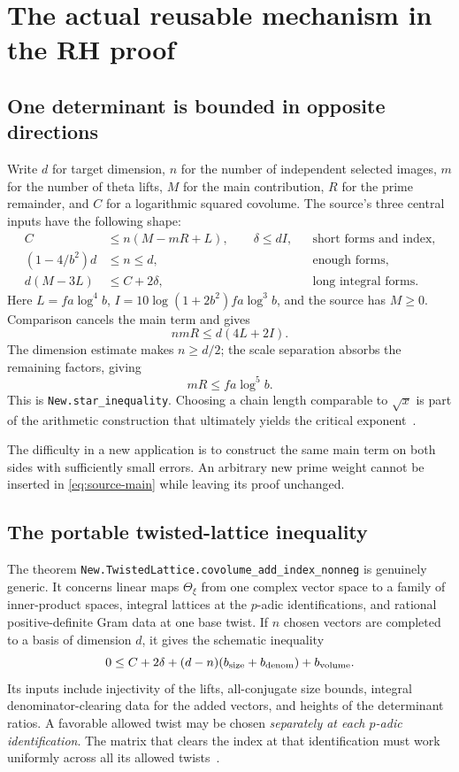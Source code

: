 \documentclass[11pt,letterpaper]{article}
\theoremstyle{remark}
\newcommand{\src}[1]{\texttt{#1}}
\begin{document}
\section{The actual reusable mechanism in the RH proof}
\label{sec:mechanism}

\subsection{One determinant is bounded in opposite directions}

Write $d$ for target dimension, $n$ for the number of independent selected
images, $m$ for the number of theta lifts, $M$ for the main contribution,
$R$ for the prime remainder, and $C$ for a logarithmic squared covolume.
The source's three central inputs have the following shape:
\begin{align*}
 C&\leq n(M-mR+L),\qquad\delta\leq dI, &&\text{short forms and index},\\
 (1-4/b^2)d&\leq n\leq d, &&\text{enough forms},\\
 d(M-3L)&\leq C+2\delta, &&\text{long integral forms}.
\end{align*}
Here $L=fa\log^4b$, $I=10\log(1+2b^2)fa\log^3b$, and the source has
$M\geq0$. Comparison cancels the main term and gives
\[
 nmR\leq d(4L+2I).
\]
The dimension estimate makes $n\geq d/2$; the scale separation absorbs
the remaining factors, giving
\begin{equation}
 mR\leq fa\log^5 b.
 \label{eq:source-main}
\end{equation}
This is \src{New.star\_inequality}. Choosing a chain length comparable to
$\sqrt{x}$ is part of the arithmetic construction that ultimately yields
the critical exponent~\cite{mainineq,guide}.

The difficulty in a new application is to construct the same main term on
both sides with sufficiently small errors. An arbitrary new prime weight
cannot be inserted in \eqref{eq:source-main} while leaving its proof
unchanged.

\subsection{The portable twisted-lattice inequality}

The theorem \src{New.TwistedLattice.covolume\_add\_index\_nonneg} is genuinely
generic. It concerns linear maps $\Theta_\xi$ from one complex vector
space to a family of inner-product spaces, integral lattices at the
$p$-adic identifications, and rational positive-definite Gram data at one
base twist. If $n$ chosen vectors are completed to a basis of dimension
$d$, it gives the schematic inequality
\begin{equation}
 0\leq C+2\delta+(d-n)(b_{\rm size}+b_{\rm denom})+b_{\rm volume}.
 \label{eq:portable-lattice}
\end{equation}
Its inputs include injectivity of the lifts, all-conjugate size bounds,
integral denominator-clearing data for the added vectors, and heights of
the determinant ratios. A favorable allowed twist may be chosen
\emph{separately at each $p$-adic identification}. The matrix that clears
the index at that identification must work uniformly across all its
allowed twists~\cite{twisted}.
\end{document}
